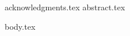 \documentclass[12pt, pdftex]{report}
\begin{document}

\thesistitlepage
\thesiscopyrightpage

{acknowledgments.tex}
{abstract.tex}

\tableofcontents
\listoffigures
\listoftables


{body.tex}





\nocite{*}

\end{document}
